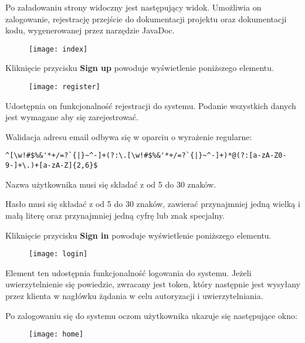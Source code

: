 \documentclass[11pt, titlepage]{article}
\begin{document}
Po załadowaniu strony widoczny jest następujący widok. Umożliwia on zalogowanie, rejestrację przejście do dokumentacji projektu oraz dokumentacji kodu, wygenerowanej przez narzędzie JavaDoc.

\begin{figure}[H]
\begin{adjustwidth}{-3cm}{}
\texttt{[image: index]}
\end{adjustwidth}
\end{figure}

Kliknięcie przycisku \textbf{Sign up} powoduje wyświetlenie poniższego elementu.

\begin{figure}[H]
\texttt{[image: register]}
\end{figure}

Udostępnia on funkcjonalność rejestracji do systemu. Podanie wszystkich danych jest wymagane aby się zarejestrować.

Walidacja adresu email odbywa się w oparciu o wyrażenie regularne:
\begin{adjustwidth}{-4cm}{}
\begin{lstlisting}
^[\w!#$%&'*+/=?`{|}~^-]+(?:\.[\w!#$%&'*+/=?`{|}~^-]+)*@(?:[a-zA-Z0-9-]+\.)+[a-zA-Z]{2,6}$
\end{lstlisting}
\end{adjustwidth}

Nazwa użytkownika musi się składać z od 5 do 30 znaków.

Hasło musi się składać z od 5 do 30 znaków, zawierać przynajmniej jedną wielką i małą literę oraz przynajmniej jedną cyfrę lub znak specjalny.

\break

Kliknięcie przycisku \textbf{Sign in} powoduje wyświetlenie poniższego elementu.

\begin{figure}[H]
\texttt{[image: login]}
\end{figure}

Element ten udostępnia funkcjonalność logowania do systemu. Jeżeli uwierzytelnienie się powiedzie, zwracany jest token, który następnie jest wysyłany przez klienta w nagłówku żądania w celu autoryzacji i uwierzytelniania.

\break

Po zalogowaniu się do systemu oczom użytkownika ukazuje się następujące okno:

\begin{figure}[H]
\begin{adjustwidth}{-3cm}{}
\texttt{[image: home]}
\end{adjustwidth}
\end{figure}
\end{document}
